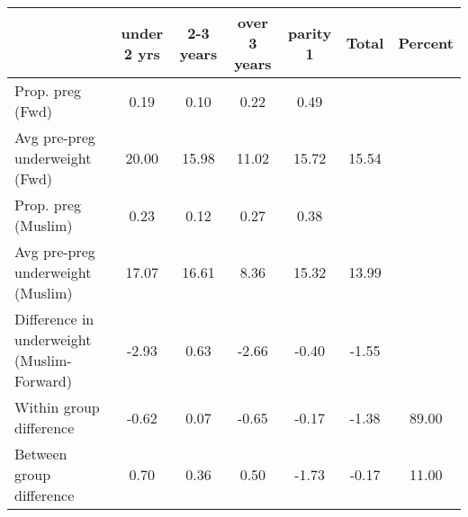 \begin{tabular}{l*{6}{c}}
\toprule
            &\multicolumn{1}{c}{under 2 yrs}&\multicolumn{1}{c}{2-3 years}&\multicolumn{1}{c}{over 3 years}&\multicolumn{1}{c}{parity 1}&\multicolumn{1}{c}{Total}&\multicolumn{1}{c}{Percent}\\
\midrule
\midrule
Prop. preg (Fwd)&        0.19&        0.10&        0.22&        0.49&            &            \\
Avg pre-preg underweight (Fwd)&       20.00&       15.98&       11.02&       15.72&       15.54&            \\
Prop. preg (Muslim)&        0.23&        0.12&        0.27&        0.38&            &            \\
Avg pre-preg underweight (Muslim)&       17.07&       16.61&        8.36&       15.32&       13.99&            \\
Difference in underweight (Muslim-Forward)&       -2.93&        0.63&       -2.66&       -0.40&       -1.55&            \\
Within group difference&       -0.62&        0.07&       -0.65&       -0.17&       -1.38&       89.00\\
Between group difference&        0.70&        0.36&        0.50&       -1.73&       -0.17&       11.00\\
\bottomrule
\end{tabular}
